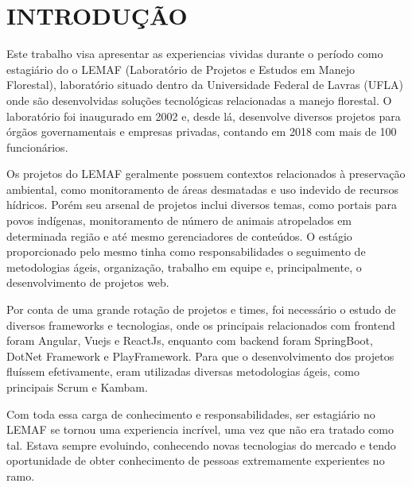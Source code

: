 \chapter{INTRODUÇÃO}
\label{cap:introducao}

Este trabalho visa apresentar as experiencias vividas durante o período como estagiário do o LEMAF (Laboratório de Projetos e Estudos
em Manejo Florestal), laboratório situado dentro da Universidade Federal de Lavras (UFLA) onde são desenvolvidas soluções tecnológicas relacionadas a manejo florestal.
O laboratório foi inaugurado em 2002 e, desde lá, desenvolve diversos projetos para órgãos governamentais e empresas privadas, contando em 2018 com mais de 100 funcionários.

Os projetos do LEMAF geralmente possuem contextos relacionados à preservação ambiental, como monitoramento de áreas desmatadas e uso indevido de recursos hídricos. Porém seu arsenal de projetos inclui diversos temas, como portais para povos indígenas, monitoramento de número de animais atropelados em determinada região e até mesmo gerenciadores de conteúdos.   
O estágio proporcionado pelo mesmo tinha como responsabilidades o seguimento de metodologias ágeis, organização, trabalho em equipe e, principalmente, o desenvolvimento de projetos web.

Por conta de uma grande rotação de projetos e times, foi necessário o estudo de diversos frameworks e tecnologias, onde os principais relacionados com frontend foram Angular, Vuejs e ReactJs, enquanto com backend foram SpringBoot, DotNet Framework e PlayFramework.
Para que o desenvolvimento dos projetos fluíssem efetivamente, eram utilizadas diversas metodologias ágeis, como principais Scrum e Kambam.

Com toda essa carga de conhecimento e responsabilidades, ser estagiário no LEMAF se tornou uma experiencia incrível, uma vez que não era tratado como tal. Estava sempre evoluindo, conhecendo novas tecnologias do mercado e tendo oportunidade de obter conhecimento de pessoas extremamente experientes no ramo.